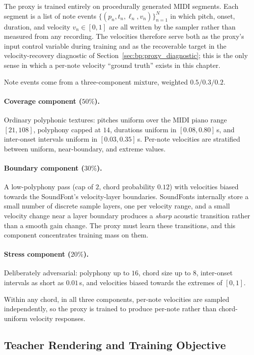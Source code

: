 The proxy is trained entirely on procedurally generated MIDI segments. Each segment is a list of note events $\{(p_n, t_n, \ell_n, v_n)\}_{n=1}^{N}$ in which pitch, onset, duration, and velocity $v_n \in [0,1]$ are all written by the sampler rather than measured from any recording. The velocities therefore serve both as the proxy's input control variable during training and as the recoverable target in the velocity-recovery diagnostic of Section~\ref{sec:bp:proxy_diagnostic}; this is the only sense in which a per-note velocity ``ground truth'' exists in this chapter.

Note events come from a three-component mixture, weighted $0.5 / 0.3 / 0.2$.

\paragraph{Coverage component ($50\%$).}
Ordinary polyphonic textures: pitches uniform over the MIDI piano range $[21, 108]$, polyphony capped at $14$, durations uniform in $[0.08, 0.80]$\,s, and inter-onset intervals uniform in $[0.03, 0.35]$\,s. Per-note velocities are stratified between uniform, near-boundary, and extreme values.

\paragraph{Boundary component ($30\%$).}
A low-polyphony pass (cap of $2$, chord probability $0.12$) with velocities biased towards the SoundFont's velocity-layer boundaries. SoundFonts internally store a small number of discrete sample layers, one per velocity range, and a small velocity change near a layer boundary produces a \emph{sharp} acoustic transition rather than a smooth gain change. The proxy must learn these transitions, and this component concentrates training mass on them.

\paragraph{Stress component ($20\%$).}
Deliberately adversarial: polyphony up to $16$, chord size up to $8$, inter-onset intervals as short as $0.01$\,s, and velocities biased towards the extremes of $[0, 1]$.

Within any chord, in all three components, per-note velocities are sampled independently, so the proxy is trained to produce per-note rather than chord-uniform velocity responses.

\subsection{Teacher Rendering and Training Objective}
\label{ssec:bp:proxy_training}

